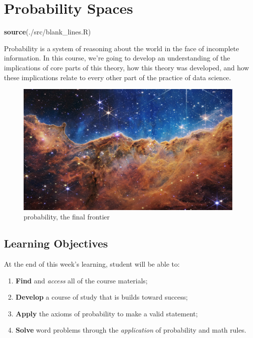 \documentclass[
]{book}
\newenvironment{Shaded}{\begin{snugshade}}{\end{snugshade}}
\newcommand{\FunctionTok}[1]{\textcolor[rgb]{0.13,0.29,0.53}{\textbf{#1}}}
\newcommand{\NormalTok}[1]{#1}
\newcommand{\StringTok}[1]{\textcolor[rgb]{0.31,0.60,0.02}{#1}}
\providecommand{\tightlist}{%
  \setlength{\itemsep}{0pt}\setlength{\parskip}{0pt}}
\theoremstyle{definition}
\theoremstyle{definition}
\theoremstyle{definition}
\theoremstyle{definition}
\theoremstyle{remark}
\begin{document}
\hypertarget{probability-spaces}{%
\chapter{Probability Spaces}\label{probability-spaces}}

\begin{Shaded}
\begin{Highlighting}[]
\FunctionTok{source}\NormalTok{(}\StringTok{\textquotesingle{}./src/blank\_lines.R\textquotesingle{}}\NormalTok{)}
\end{Highlighting}
\end{Shaded}

Probability is a system of reasoning about the world in the face of incomplete information. In this course, we're going to develop an understanding of the implications of core parts of this theory, how this theory was developed, and how these implications relate to every other part of the practice of data science.

\begin{figure}
\centering
\includegraphics{./images/webb.jpg}
\caption{probability, the final frontier}
\end{figure}

\hypertarget{learning-objectives}{%
\section{Learning Objectives}\label{learning-objectives}}

At the end of this week's learning, student will be able to:

\begin{enumerate}
\def\labelenumi{\arabic{enumi}.}
\tightlist
\item
  \textbf{Find} and \emph{access} all of the course materials;
\item
  \textbf{Develop} a course of study that is builds toward success;
\item
  \textbf{Apply} the axioms of probability to make a valid statement;
\item
  \textbf{Solve} word problems through the \emph{application} of probability and math rules.
\end{enumerate}
\end{document}
